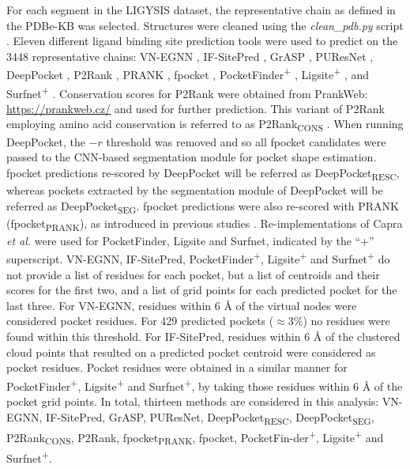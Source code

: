 For each segment in the LIGYSIS dataset, the representative chain as defined in the PDBe-KB was selected. Structures were cleaned using the \textit{clean\_pdb.py} script \cite{JUBB_2019_PDBTOOLS}. Eleven different ligand binding site prediction tools were used to predict on the 3448 representative chains: VN-EGNN \cite{SESTAK_2024_VNEGNN}, IF-SitePred \cite{CARBERY_2024_IFSP}, GrASP \cite{SMITH_2024_GrASP}, PUResNet \cite{KANDEL_2021_PURESNET, KANDEL_2024_PURESNET}, DeepPocket \cite{AGGARWAL_2022_DEEPPOCKET}, P2Rank \cite{KRIVAK_2015_P2RANK, KRIVAK_2018_P2RANK}, PRANK \cite{KRIVAK_2015_PRANK}, fpocket \cite{GUILLOUX_2009_FPOCKET, SCHMIDTKE_2010_FPOCKET2}, PocketFinder\textsuperscript{+} \cite{AN_2005_POCKETFINDER}, Ligsite\textsuperscript{+} \cite{HENDLICH_1997_LIGSITE}, and Surfnet\textsuperscript{+} \cite{LASKOWSKI_1995_SURFNET}. Conservation scores for P2Rank were obtained from PrankWeb: \url{https://prankweb.cz/} and used for further prediction. This variant of P2Rank employing amino acid conservation is referred to as P2Rank\textsubscript{CONS} \cite{JENDELE_2019_PRANKWEB, JAKUBEC_2022_PRANKWEB}. When running DeepPocket, the $-r$ threshold was removed and so all fpocket candidates were passed to the CNN-based segmentation module for pocket shape estimation. fpocket predictions re-scored by DeepPocket will be referred as DeepPocket\textsubscript{RESC}, whereas pockets extracted by the segmentation module of DeepPocket will be referred as DeepPocket\textsubscript{SEG}. fpocket predictions were also re-scored with PRANK \cite{KRIVAK_2015_PRANK} (fpocket\textsubscript{PRANK}), as introduced in previous studies \cite{KRIVAK_2015_PRANK, KRIVAK_2015_P2RANK, KRIVAK_2018_P2RANK, COMAJUNCOSA_2024_POCKETS}. Re-implementations of Capra \textit{et al.} \cite{CAPRA_2009_CONCAVITY} were used for PocketFinder, Ligsite and Surfnet, indicated by the ``+'' superscript. VN-EGNN, IF-SitePred, PocketFinder\textsuperscript{+}, Ligsite\textsuperscript{+} and Surfnet\textsuperscript{+} do not provide a list of residues for each pocket, but a list of centroids and their scores for the first two, and a list of grid points for each predicted pocket for the last three. For VN-EGNN, residues within 6 \AA{} of the virtual nodes were considered pocket residues. For 429 predicted pockets ($\approx$3\%) no residues were found within this threshold. For IF-SitePred, residues within 6 \AA{} of the clustered cloud points that resulted on a predicted pocket centroid were considered as pocket residues. Pocket residues were obtained in a similar manner for PocketFinder\textsuperscript{+}, Ligsite\textsuperscript{+} and Surfnet\textsuperscript{+}, by taking those residues within 6 \AA{} of the pocket grid points. In total, thirteen methods are considered in this analysis: VN-EGNN, IF-SitePred, GrASP, PUResNet, DeepPocket\textsubscript{RESC}, DeepPocket\textsubscript{SEG}, P2Rank\textsubscript{CONS}, P2Rank, fpocket\textsubscript{PRANK}, fpocket, PocketFin-der\textsuperscript{+}, Ligsite\textsuperscript{+} and Surfnet\textsuperscript{+}.

